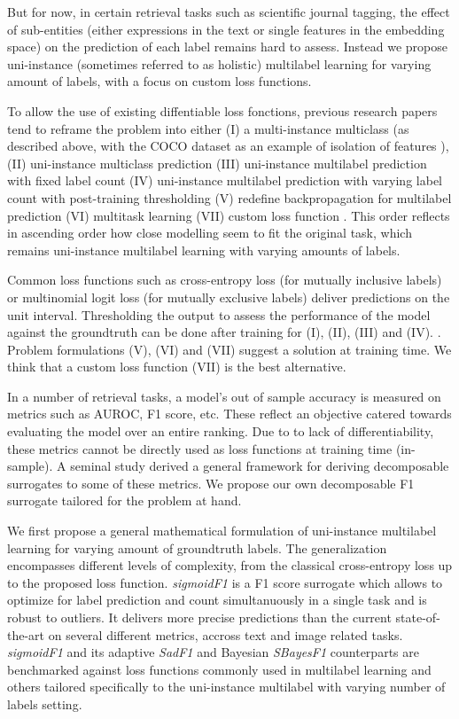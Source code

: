 But for now, in certain retrieval tasks such as scientific journal tagging, the effect of sub-entities (either expressions in the text or single features in the embedding space) on the prediction of each label remains hard to assess. Instead we propose uni-instance (sometimes referred to as holistic) multilabel learning for varying amount of labels, with a focus on custom loss functions.

To allow the use of existing diffentiable loss fonctions, previous research papers tend to reframe the problem into either (I) a multi-instance multiclass (as described above, with the COCO dataset as an example of isolation of features \cite{COCO}), (II) uni-instance multiclass prediction (III) uni-instance multilabel prediction with fixed label count (IV) uni-instance multilabel prediction with varying label count with post-training thresholding (V) redefine backpropagation for multilabel prediction \cite{multilabelBackprop} (VI) multitask learning \cite{multitaskLabel} (VII) custom loss function \cite{tencent}. This order reflects in ascending order how close modelling seem to fit the original task, which remains uni-instance multilabel learning with varying amounts of labels. 

Common loss functions such as cross-entropy loss (for mutually inclusive labels) or multinomial logit loss (for mutually exclusive labels) deliver predictions on the unit interval. Thresholding the output to assess the performance of the model against the groundtruth can be done after training for (I), (II), (III) and (IV). . Problem formulations (V), (VI) and (VII) suggest a solution at training time. We think that a custom loss function (VII) is the best alternative. 

In a number of retrieval tasks, a model's out of sample accuracy is measured on metrics such as AUROC, F1 score, etc. These reflect an objective catered towards evaluating the model over an entire ranking. Due to to lack of differentiability, these metrics cannot be directly used as loss functions at training time (in-sample). A seminal study \cite{optimizableLosses} derived a general framework for deriving decomposable surrogates to some of these metrics. We propose our own decomposable F1 surrogate tailored for the problem at hand.

We first propose a general mathematical formulation of uni-instance multilabel learning for varying amount of groundtruth labels. The generalization encompasses different levels of complexity, from the classical cross-entropy loss up to the proposed loss function. \emph{sigmoidF1} is a F1 score surrogate which allows to optimize for label prediction and count simultanuously in a single task and is robust to outliers. It delivers more precise predictions than the current state-of-the-art on several different metrics, accross text and image related tasks. \emph{sigmoidF1} and its adaptive \emph{SadF1} and Bayesian \emph{SBayesF1} counterparts are benchmarked against loss functions commonly used in multilabel learning and others tailored specifically to the uni-instance multilabel with varying number of labels setting.
